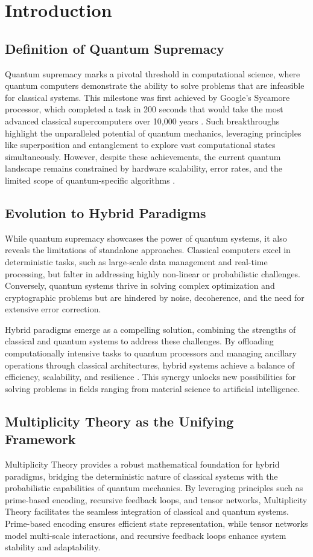 \documentclass{article}
\theoremstyle{plain}
\begin{document}
\section{Introduction}

\subsection{Definition of Quantum Supremacy}
Quantum supremacy marks a pivotal threshold in computational science, where quantum computers demonstrate the ability to solve problems that are infeasible for classical systems. This milestone was first achieved by Google's Sycamore processor, which completed a task in 200 seconds that would take the most advanced classical supercomputers over 10,000 years \cite{arute2019quantum}. Such breakthroughs highlight the unparalleled potential of quantum mechanics, leveraging principles like superposition and entanglement to explore vast computational states simultaneously. However, despite these achievements, the current quantum landscape remains constrained by hardware scalability, error rates, and the limited scope of quantum-specific algorithms \cite{preskill2018quantum}.

\subsection{Evolution to Hybrid Paradigms}
While quantum supremacy showcases the power of quantum systems, it also reveals the limitations of standalone approaches. Classical computers excel in deterministic tasks, such as large-scale data management and real-time processing, but falter in addressing highly non-linear or probabilistic challenges. Conversely, quantum systems thrive in solving complex optimization and cryptographic problems but are hindered by noise, decoherence, and the need for extensive error correction.

Hybrid paradigms emerge as a compelling solution, combining the strengths of classical and quantum systems to address these challenges. By offloading computationally intensive tasks to quantum processors and managing ancillary operations through classical architectures, hybrid systems achieve a balance of efficiency, scalability, and resilience \cite{zhang2021hybrid}. This synergy unlocks new possibilities for solving problems in fields ranging from material science to artificial intelligence.

\subsection{Multiplicity Theory as the Unifying Framework}
Multiplicity Theory provides a robust mathematical foundation for hybrid paradigms, bridging the deterministic nature of classical systems with the probabilistic capabilities of quantum mechanics. By leveraging principles such as prime-based encoding, recursive feedback loops, and tensor networks, Multiplicity Theory facilitates the seamless integration of classical and quantum systems. Prime-based encoding ensures efficient state representation, while tensor networks model multi-scale interactions, and recursive feedback loops enhance system stability and adaptability.
\end{document}
